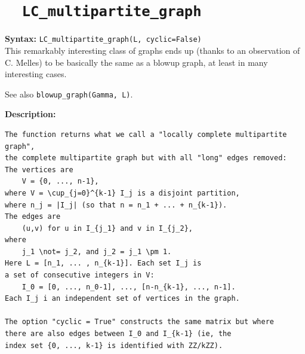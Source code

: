 \documentclass{article}
\begin{document}
\section{\tt \ \ LC\_multipartite\_graph}

\textbf{Syntax:} \verb}LC_multipartite_graph(L, cyclic=False)}\\

This remarkably interesting class of graphs ends up (thanks to
an observation of C. Melles) to be basically the same as a blowup graph,
at least in many interesting cases.

See also \verb}blowup_graph(Gamma, L)}.

\textbf{Description:}
\begin{verbatim}
The function returns what we call a "locally complete multipartite graph",
the complete multipartite graph but with all "long" edges removed:
The vertices are
    V = {0, ..., n-1},
where V = \cup_{j=0}^{k-1} I_j is a disjoint partition,
where n_j = |I_j| (so that n = n_1 + ... + n_{k-1}).
The edges are
    (u,v) for u in I_{j_1} and v in I_{j_2},
where
    j_1 \not= j_2, and j_2 = j_1 \pm 1. 
Here L = [n_1, ... , n_{k-1}]. Each set I_j is
a set of consecutive integers in V:
    I_0 = [0, ..., n_0-1], ..., [n-n_{k-1}, ..., n-1].
Each I_j i an independent set of vertices in the graph.

The option "cyclic = True" constructs the same matrix but where
there are also edges between I_0 and I_{k-1} (ie, the
index set {0, ..., k-1} is identified with ZZ/kZZ).
\end{verbatim}
\end{document}
